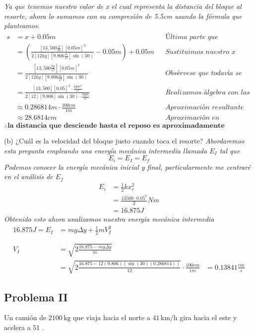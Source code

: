 \documentclass{article}
\begin{document}
\newpage
\textit{Ya que tenemos nuestro valor de x el cual representa la distancia del bloque al resorte, ahora lo sumamos con su compresión de 5.5cm usando la fórmula que planteamos.}
\begin{align*}
    s &= x + 0.05m && \textit{Última parte que concluimos} \\
    &= \left(\frac{\left[13,500 \frac{N}{m}\right][0.05m]^2}{2[12kg]\left[9.806\frac{m}{s^2}\right]\sin(30)} - 0.05m \right) + 0.05m && \textit{Sustituimos nuestro x completo} \\
    &= \frac{\left[13,500 \frac{kg}{s^2}\right][0.05m]^2}{2[12kg]\left[9.806\frac{m}{s^2}\right]\sin(30)} && \textit{Obsérvese que todavía se podían reducir términos} \\
    &= \frac{\left[13,500\right][0.05]^2 \cdot \frac{kgm^2}{s^2}}{2[12]\left[9.806\right]\sin(30) \cdot \frac{kgm}{s^2}} && \textit{Realizamos álgebra con las unidades} \\
    &\approx 0.286814m \cdot \frac{100cm}{1m} && \textit{Aproximación resultante} \\
    &\approx 28.6814cm && \textit{Aproximación en centímetros para mayor comprensión}
\end{align*}
\[ \therefore \textbf{la distancia que desciende hasta el reposo es aproximadamente 28.6814cm}\]

   (b) ¿Cuál es la velocidad del bloque justo cuando toca el resorte?
\textit{Abordaremos esta pregunta empleando una energía mecánica intermedia llamada $E_I$ tal que}
\[ E_i = E_I = E_f \]
\textit{Podemos conocer la energía mecánica inicial y final, particularmente me centraré en el análisis de $E_f$}
\begin{align*}
    E_i &= \frac{1}{2}kx_r^2 \\
    &= \frac{13500\cdot0.05^2}{2}Nm\\
    &= 16.875 J
\end{align*}
\textit{Obtenido esto ahora analizamos nuestra energía mecánica intermedia}
\begin{align*}
    16.875 J = E_I &= mg\Delta y + \frac{1}{2}mV_I^2 \\
    & \\
    & \\
    V_I &= \sqrt{2\frac{16.875 - mg\Delta y}{m}} \\
    &= \sqrt{2\frac{16.875 - 12(9.806)(\sin(30)(0.286814))}{12}} \cdot \frac{100cm}{1m}
    &= 0.13841 \frac{cm}{s}
\end{align*}
\subsection*{Problema II}
   Un camión de \(2100\,\text{kg}\) que viaja hacia el norte a \(41\,\text{km/h}\) gira hacia el este y acelera a \(51\) .
\end{document}
